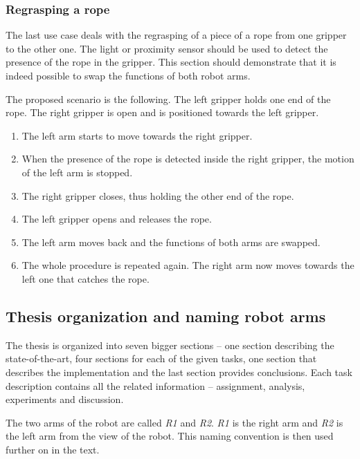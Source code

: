         \subsubsection{Regrasping a rope}
            The last use case deals with the regrasping of a piece of a rope from one gripper to the other one. The light or proximity sensor should be used to detect the presence of the rope in the gripper. This section should demonstrate that it is indeed possible to swap the functions of both robot arms.

            The proposed scenario is the following. The left gripper holds one end of the rope. The right gripper is open and is positioned towards the left gripper.
%
            \begin{enumerate}
                \item The left arm starts to move towards the right gripper.
                \item When the presence of the rope is detected inside the right gripper, the motion of the left arm is stopped.
                \item The right gripper closes, thus holding the other end of the rope.
                \item The left gripper opens and releases the rope.
                \item The left arm moves back and the functions of both arms are swapped.
                \item The whole procedure is repeated again. The right arm now moves towards the left one that catches the rope.
            \end{enumerate}



    \subsection{Thesis organization and naming robot arms}
        The thesis is organized into seven bigger sections -- one section describing the state-of-the-art, four sections for each of the given tasks, one section that describes the implementation and the last section provides conclusions. Each task description contains all the related information -- assignment, analysis, experiments and discussion.

        The two arms of the \CloPeMa\/ robot are called \textit{R1} and \textit{R2}. \textit{R1} is the right arm and \textit{R2} is the left arm from the view of the robot. This naming convention is then used further on in the text.

\clearpage 